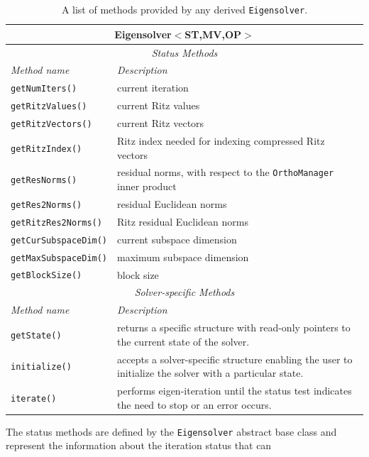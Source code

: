 \documentclass[acmtoms,acmnow]{acmtrans2m}
\newcommand{\aspace}[1]{\texttt{#1}}
\begin{document}
\begin{table}[htp]
\begin{center}
\caption{A list of methods provided by any derived \aspace{Eigensolver}.} 
\label{tab:anasazi:itermethods}
\begin{tabular}{| p{3cm} | p{6cm} |}
\hline
\multicolumn{2}{|c|}{\textbf{Eigensolver$<$ST,MV,OP$>$}} \\\hline
\multicolumn{2}{|c|}{\emph{Status Methods}} \\
\hline
\emph{Method name} & \emph{Description} \\
\hline
{\tt getNumIters()}       & current iteration \\
{\tt getRitzValues()}     & current Ritz values \\
{\tt getRitzVectors()}    & current Ritz vectors \\
{\tt getRitzIndex()}      & Ritz index needed for indexing compressed Ritz vectors \\
{\tt getResNorms()}       & residual norms, with respect to the \aspace{OrthoManager} inner product \\
{\tt getRes2Norms()}      & residual Euclidean norms \\
{\tt getRitzRes2Norms()}  & Ritz residual  Euclidean norms \\
{\tt getCurSubspaceDim()} & current subspace dimension \\
{\tt getMaxSubspaceDim()} & maximum subspace dimension \\
{\tt getBlockSize()}      & block size \\
\hline
\multicolumn{2}{|c|}{\emph{Solver-specific Methods}} \\
\hline
\emph{Method name} & \emph{Description} \\
\hline
{\tt getState()}       & returns a specific structure with read-only pointers to
                       the current state of the solver. \\
{\tt initialize()}     & accepts a solver-specific structure enabling the user to initialize
                       the solver with a particular state.\\
{\tt iterate()}        & performs eigen-iteration until the status test indicates the need
                       to stop or an error occurs.\\
\hline
\end{tabular}
\end{center}
\end{table}
The status methods are defined by the \aspace{Eigensolver}
abstract base class and represent the information about the iteration status that can 
\end{document}

